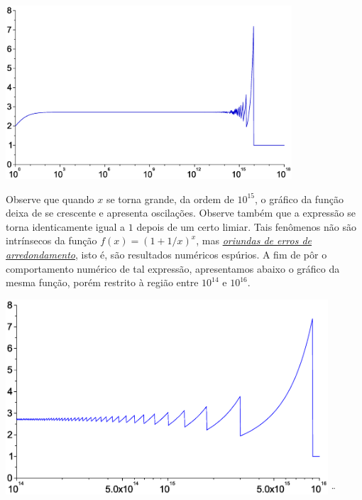 \begin{ex}
\includegraphics[width=0.8\textwidth]{./cap_aritmetica/pics/cancelamento_euler.eps}

Observe que quando $x$ se torna grande, da ordem de $10^{15}$, o gráfico da função deixa de se crescente e apresenta oscilações.  Observe também que a expressão se torna identicamente igual a $1$ depois de um certo limiar. Tais fenômenos não são intrínsecos da função $f(x)=(1+1/x)^x$, mas \emph{\uline{oriundas de erros de arredondamento}}, isto é, são resultados numéricos espúrios. A fim de pôr o comportamento numérico de tal expressão, apresentamos abaixo o gráfico da mesma função, porém restrito à região entre $10^{14}$ e $10^{16}$.

\includegraphics[width=0.9\textwidth]{./cap_aritmetica/pics/cancelamento_euler2.eps}
¨%
\end{ex}

